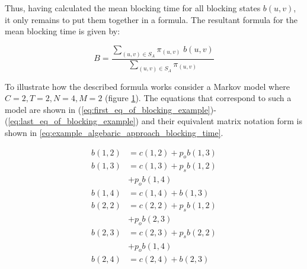 Thus, having calculated the mean blocking time for all blocking states \(b(u,v)\), 
it only remains to put them together in a formula.
The resultant formula for the mean blocking time is given by:

\begin{equation}\label{eq:algebraic_blocking_time}
    B = \frac{\sum_{(u,v) \in S_A} \pi_{(u,v)} \; b(u,v)}{\sum_{(u,v) \in S_A} 
    \pi_{(u,v)}}
\end{equation}



To illustrate how the described formula works consider a Markov model where 
\(C=2, T=2, N=4, M=2\) (figure \ref{fig:example_algeb_blocking}). 
The equations that correspond to such a model are shown in 
(\ref{eq:first_eq_of_blocking_example})-(\ref{eq:last_eq_of_blocking_example}) 
and their equivalent matrix notation form is shown in 
\ref{eq:example_algebaric_approach_blocking_time}.

\begin{minipage}{.5\textwidth}
    \begin{figure}[H]
        \scalebox{0.6}{}
        \caption{
        }
        \label{fig:example_algeb_blocking}
    \end{figure}
\end{minipage}
\begin{minipage}{.43\textwidth}
    \begin{align}
        b(1,2) &= c(1,2) + p_o b(1,3) \label{eq:first_eq_of_blocking_example} \\
        b(1,3) &= c(1,3) + p_s b(1,2) \nonumber \\ &+ p_o b(1,4) \\
        b(1,4) &= c(1,4) + b(1,3) \\
        b(2,2) &= c(2,2) + p_s b(1,2) \nonumber \\ &+ p_o b(2,3) \\
        b(2,3) &= c(2,3) + p_s b(2,2) \nonumber \\ &+ p_o b(1,4) \\
        b(2,4) &= c(2,4) + b(2,3) \label{eq:last_eq_of_blocking_example}
    \end{align}
\end{minipage}

